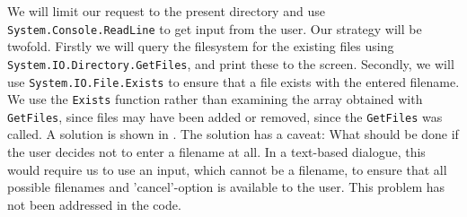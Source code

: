 \documentclass[fsharpNotes.tex]{subfiles}
\begin{document}
We will limit our request to the present directory and use \lstinline{System.Console.ReadLine} to get input from the user. Our strategy will be twofold. Firstly we will query the filesystem for the existing files using \lstinline{System.IO.Directory.GetFiles}, and print these to the screen. Secondly, we will use \lstinline{System.IO.File.Exists} to ensure that a file exists with the entered filename. We use the \lstinline{Exists} function rather than examining the array obtained with \lstinline{GetFiles}, since files may have been added or removed, since the \lstinline{GetFiles} was called. A solution is shown in .
%
%
The solution has a caveat: What should be done if the user decides not to enter a filename at all.  In a text-based dialogue, this would require us to use an input, which cannot be a filename, to ensure that all possible filenames and 'cancel'-option is available to the user. This problem has not been addressed in the code. 

\end{document}
